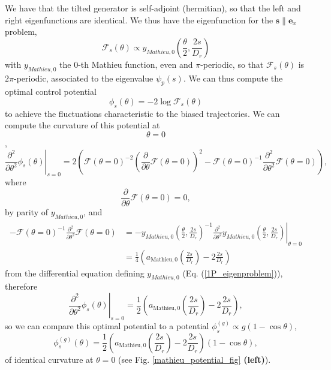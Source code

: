 \documentclass[pre,aps,superscriptaddress,nofootinbib]{revtex4}
\begin{document}
We have that the tilted generator is self-adjoint (hermitian), so that the left and right eigenfunctions are identical. We thus have the eigenfunction for the $\bm{s} \parallel \bm{e}_x$ problem,
\begin{equation}
\mathcal{F}_s(\theta) \propto y_{Mathieu, 0}\left(\frac{\theta}{2}, \frac{2s}{D_r}\right)
\end{equation}
with $y_{Mathieu, 0}$ the $0$-th Mathieu function, even and $\pi$-periodic, so that $\mathcal{F}_s(\theta)$ is $2\pi$-periodic, associated to the eigenvalue $\psi_{p}(s)$. We can thus compute the optimal control potential \cite{jack2019ergodicity}
\begin{equation}
\phi_s(\theta) = - 2 \log \mathcal{F}_s(\theta)
\end{equation}
to achieve the fluctuations characteristic to the biased trajectories. We can compute the curvature of this potential at $$\theta = 0$$,
\begin{equation}
\left. \frac{\partial^2}{\partial \theta^2} \phi_s(\theta) \right|_{s=0} = 2 \left(\mathcal{F}(\theta = 0)^{-2} \left(\frac{\partial}{\partial \theta} \mathcal{F}(\theta = 0)\right)^2 - \mathcal{F}(\theta = 0)^{-1}\frac{\partial^2}{\partial\theta^2} \mathcal{F}(\theta = 0)\right),
\end{equation}
where
\begin{equation}
\frac{\partial}{\partial \theta} \mathcal{F}(\theta = 0) = 0,
\end{equation}
by parity of $y_{Mathieu, 0}$, and
\begin{equation}
\begin{aligned}
- \mathcal{F}(\theta = 0)^{-1}\frac{\partial^2}{\partial\theta^2} \mathcal{F}(\theta = 0) &= \left. - y_{Mathieu, 0}\left(\frac{\theta}{2}, \frac{2s}{D_r}\right)^{-1}\frac{\partial^2}{\partial\theta^2} y_{Mathieu, 0}\left(\frac{\theta}{2}, \frac{2s}{D_r}\right) \right|_{\theta=0}\\
&= \frac{1}{4} \left(a_{\mathrm{Mathieu}, 0}\left(\frac{2s}{D_r}\right) - 2 \frac{2s}{D_r}\right)
\end{aligned}
\end{equation}
from the differential equation defining $y_{Mathieu, 0}$ (Eq. (\ref{1P_eigenproblem})), therefore
\begin{equation}
\left. \frac{\partial^2}{\partial \theta^2} \phi_s(\theta) \right|_{s=0} = \frac{1}{2} \left(a_{\mathrm{Mathieu}, 0}\left(\frac{2s}{D_r}\right) - 2 \frac{2s}{D_r}\right),
\end{equation}
so we can compare this optimal potential to a potential $\phi^{(g)}_s \propto g (1 - \cos\theta)$,
\begin{equation}
\phi^{(g)}_s(\theta) = \frac{1}{2} \left(a_{\mathrm{Mathieu}, 0}\left(\frac{2s}{D_r}\right) - 2 \frac{2s}{D_r}\right) (1 - \cos\theta),
\end{equation}
of identical curvature at $\theta = 0$ (see Fig. \ref{mathieu_potential_fig} \textbf{(left)}).
\end{document}
